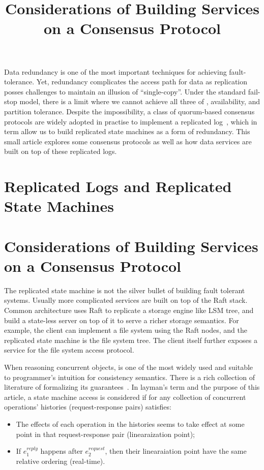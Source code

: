 



\tableofcontents

\title{Considerations of Building Services on a Consensus Protocol}
\maketitle

Data redundancy is one of the most important techniques for achieving
fault-tolerance. Yet, redundancy complicates the access path for data as
replication posses challenges to maintain an illusion of ``single-copy''.
Under the standard fail-stop model, there is a limit where we cannot achieve
all three of \Lconsistent, availability, and partition tolerance. Despite the
impossibility, a class of quorum-based consensus protocols are widely adopted
in practise to implement a replicated log~\cite{lampson1996build}, which in
term allow us to build replicated state machines as a form of redundancy.
This small article explores some consensus protocols as well as how data
services are built on top of these replicated logs.

\section{Replicated Logs and Replicated State Machines}

\section{Considerations of Building Services on a Consensus Protocol}
The replicated state machine is not the silver bullet of building fault
tolerant systems. Usually more complicated services are built on top of the
Raft stack.
Common architecture uses Raft to replicate a storage engine like LSM tree,
and build a state-less server on top of it to serve a richer storage
semantics.
For example, the client can implement a file system using the Raft nodes, and
the replicated state machine is the file system tree. The client itself
further exposes a service for the file system access protocol.

When reasoning concurrent objects, \Lconsistent is one of the most widely
used and suitable to programmer's intuition for consistency semantics. There
is a rich collection of literature of formalizing its
guarantees~\cite{herlihy1990linearizability, herlihy2011art}. In layman's
term and the purpose of this article, a state machine access is considered
\Lconsistent if for any collection of concurrent operations' histories
(request-response pairs) satisfies:
\begin{itemize}
    \item The effects of each operation in the histories seems to take effect
    at some point in that request-response pair (linearaization point);
    \item If $e_1^{reply}$ happens after $e_2^{request}$, then their
    linearaiation point have the same relative ordering (real-time).
\end{itemize}

